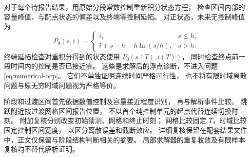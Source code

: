 对于每个待报告结果，用原始分段常数控制重新积分状态方程，
检查区间内部的容量峰值、与配点状态的偏差以及终端零控制延拓。
对正状态，未来无控制峰值为
\[
 P_0(s,i)=
 \begin{cases}
  i,&s\le h,\\
  i+s-h-h\ln(s/h),&s>h.
 \end{cases}
\]
终端延拓检查对重积分得到的状态使用 $P_0(s(T),i(T))$，
同时检查终点前一段时间内的控制是否已接近零。
这些是求解后的浮点诊断，不进入问题\eqref{eq:numerical-ocp}。
它们不单独证明连续时间严格可行性，
也不将有限时域离散问题与原无穷时域问题视为严格等价。

阶段和过渡区间首先依据数值控制及容量接近程度识别，
再与解析事件比较。
跳跃附近按过渡网格区间报告位置，
不以首个纯控制单元的起点代替连续切换时刻。
附加复核分别改变初始猜测、网格和终止时刻；
网格比较固定 $T$，时域比较固定控制区间宽度，
以区分离散误差和截断效应。
详细复核保留在配套结果文件中，正文仅保留与阶段结构判断相关的摘要。
局部求解器的重复收敛及有限样本复核均不替代解析证明。

\NumFindingParagraph{\NumCheckStatement}
\NumFindingParagraph{\NumRobustnessStatement}

